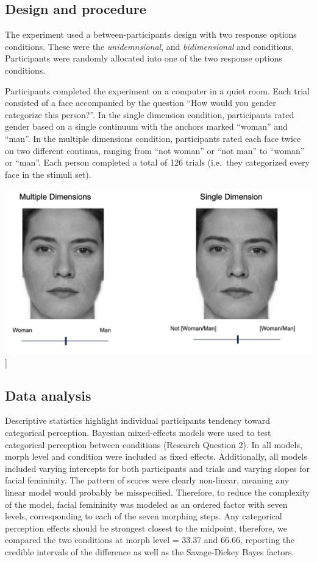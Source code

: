 \documentclass[
  man]{apa7}
\begin{document}
\hypertarget{design-and-procedure}{%
\subsection{Design and procedure}\label{design-and-procedure}}

The experiment used a between-participants design with two response options conditions. These were the \emph{unidemnsional}, and \emph{bidimensional} and conditions. Participants were randomly allocated into one of the two response options conditions.

Participants completed the experiment on a computer in a quiet room. Each trial consisted of a face accompanied by the question ``How would you gender categorize this person?''. In the single dimension condition, participants rated gender based on a single continuum with the anchors marked ``woman'' and ``man''. In the multiple dimensions condition, participants rated each face twice on two different continua, ranging from ``not woman'' or ``not man'' to ``woman'' or ``man''. Each person completed a total of 126 trials (i.e.~they categorized every face in the stimuli set).

\includegraphics{pix/exp2.png}{]}

\hypertarget{data-analysis}{%
\subsection{Data analysis}\label{data-analysis}}

Descriptive statistics highlight individual participants tendency toward categorical perception. Bayesian mixed-effects models were used to test categorical perception between conditions (Research Question 2). In all models, morph level and condition were included as fixed effects. Additionally, all models included varying intercepts for both participants and trials and varying slopes for facial femininity. The pattern of scores were clearly non-linear, meaning any linear model would probably be misspecified. Therefore, to reduce the complexity of the model, facial femininity was modeled as an ordered factor with seven levels, corresponding to each of the seven morphing steps. Any categorical perception effects should be strongest closest to the midpoint, therefore, we compared the two conditions at morph level = 33.37 and 66.66, reporting the credible intervals of the difference as well as the Savage-Dickey Bayes factors.
\end{document}
